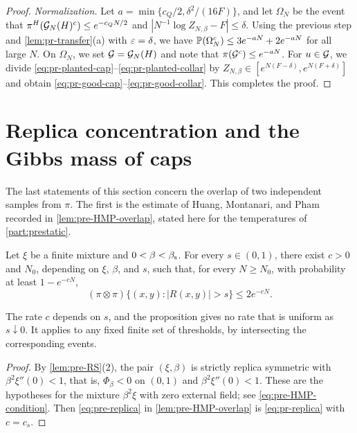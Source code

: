 \begin{proof}
\emph{Normalization.} Let $a=\min\{c_Q/2,\delta^2/(16F)\}$, and let $\Omega_N$ be the event that $\pi^H(\mathcal G_N(H)^c)\le e^{-c_QN/2}$ and $|N^{-1}\log Z_{N,\beta}-F|\le\delta$. Using the previous step and \cref{lem:pr-transfer}(a) with $\varepsilon=\delta$, we have $\mathbb P(\Omega_N^c)\le3e^{-aN}+2e^{-aN}$ for all large $N$. On $\Omega_N$, we set $\mathcal G=\mathcal G_N(H)$ and note that $\pi(\mathcal G^c)\le e^{-aN}$. For $u\in\mathcal G$, we divide \eqref{eq:pr-planted-cap}--\eqref{eq:pr-planted-collar} by $Z_{N,\beta}\in[e^{N(F-\delta)},e^{N(F+\delta)}]$ and obtain \eqref{eq:pr-good-cap}--\eqref{eq:pr-good-collar}. This completes the proof.
\end{proof}


\section{Replica concentration and the Gibbs mass of caps}\label{sec:pr-replica}

The last statements of this section concern the overlap of two independent samples from $\pi$. The first is the estimate of Huang, Montanari, and Pham recorded in \cref{lem:pre-HMP-overlap}, stated here for the temperatures of \cref{part:prestatic}.

\begin{proposition}\label{prop:pr-replica}
Let $\xi$ be a finite mixture and $0<\beta<\beta_{\mathrm s}$. For every $s\in(0,1)$, there exist $c>0$ and $N_0$, depending on $\xi$, $\beta$, and $s$, such that, for every $N\ge N_0$, with probability at least $1-e^{-cN}$,
\begin{equation}\label{eq:pr-replica}
(\pi\otimes\pi)\bigl\{(x,y)\colon|R(x,y)|>s\bigr\}\le2e^{-cN}.
\end{equation}
\end{proposition}

The rate $c$ depends on $s$, and the proposition gives no rate that is uniform as $s\downarrow0$. It applies to any fixed finite set of thresholds, by intersecting the corresponding events.

\begin{proof}
By \cref{lem:pre-RS}(2), the pair $(\xi,\beta)$ is strictly replica symmetric with $\beta^2\xi''(0)<1$, that is, $\Phi_\beta<0$ on $(0,1)$ and $\beta^2\xi''(0)<1$. These are the hypotheses \cite[Eq.~(7.9)]{HuangMontanariPham2024} for the mixture $\beta^2\xi$ with zero external field; see \eqref{eq:pre-HMP-condition}. Then \eqref{eq:pre-replica} in \cref{lem:pre-HMP-overlap} is \eqref{eq:pr-replica} with $c=c_s$.
\end{proof}

